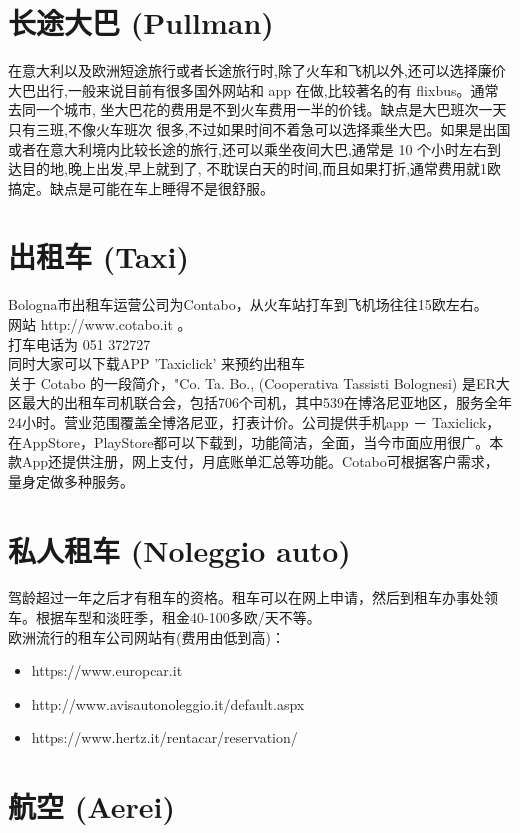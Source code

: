 \section{长途大巴 (Pullman)}
在意大利以及欧洲短途旅行或者长途旅行时,除了火车和飞机以外,还可以选择廉价大巴出行,一般来说目前有很多国外网站和 app 在做,比较著名的有 flixbus。通常去同一个城市, 坐大巴花的费用是不到火车费用一半的价钱。缺点是大巴班次一天只有三班,不像火车班次 很多,不过如果时间不着急可以选择乘坐大巴。如果是出国或者在意大利境内比较长途的旅行,还可以乘坐夜间大巴,通常是 10 个小时左右到达目的地,晚上出发,早上就到了, 不耽误白天的时间,而且如果打折,通常费用就1欧搞定。缺点是可能在车上睡得不是很舒服。

\section{出租车 (Taxi)}
Bologna市出租车运营公司为Contabo，从火车站打车到飞机场往往15欧左右。\\
网站 http://www.cotabo.it 。\\
打车电话为 051 372727 \\
同时大家可以下载APP 'Taxiclick' 来预约出租车\\
关于 Cotabo 的一段简介，"Co. Ta. Bo., (Cooperativa Tassisti Bolognesi) 是ER大区最大的出租车司机联合会，包括706个司机，其中539在博洛尼亚地区，服务全年24小时。营业范围覆盖全博洛尼亚，打表计价。公司提供手机app － Taxiclick，在AppStore，PlayStore都可以下载到，功能简洁，全面，当今市面应用很广。本款App还提供注册，网上支付，月底账单汇总等功能。Cotabo可根据客户需求，量身定做多种服务。


\section{私人租车 (Noleggio auto)}
驾龄超过一年之后才有租车的资格。租车可以在网上申请，然后到租车办事处领车。根据车型和淡旺季，租金40-100多欧/天不等。\\
欧洲流行的租车公司网站有(费用由低到高)：
\begin{itemize}
\item https://www.europcar.it
\item http://www.avisautonoleggio.it/default.aspx 
\item https://www.hertz.it/rentacar/reservation/
\end{itemize}


\section{航空 (Aerei)}

